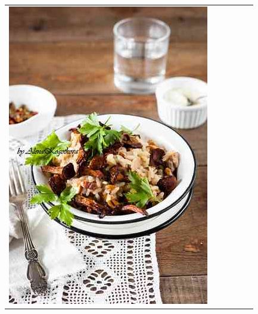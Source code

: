 \begin{figure}
\begin{tabular}{m{.01\linewidth} m{.16\linewidth} m{.16\linewidth} m{.16\linewidth} m{.16\linewidth} m{.16\linewidth}}
    \includegraphics[width=\linewidth]{../style/figures/flickr_on_flickr/pred_style_Romantic/1.jpg} &

\end{tabular}
\end{figure}

